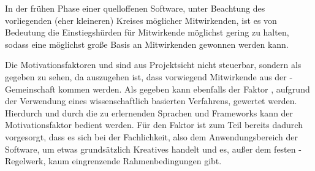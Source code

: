 In der frühen Phase einer quelloffenen Software, unter Beachtung des vorliegenden (eher kleineren) Kreises möglicher Mitwirkenden, ist es von Bedeutung die Einstiegshürden für Mitwirkende möglichst gering zu halten, sodass eine möglichst große Basis an Mitwirkenden gewonnen werden kann.

Die Motivationsfaktoren  und  sind aus Projektsicht nicht steuerbar, sondern als gegeben zu sehen, da auszugehen ist, dass vorwiegend Mitwirkende aus der -Gemeinschaft kommen werden.
Als gegeben kann ebenfalls der Faktor , aufgrund der Verwendung eines wissenschaftlich basierten Verfahrens, gewertet werden.
Hierdurch und durch die zu erlernenden Sprachen und Frameworks kann der Motivationsfaktor  bedient werden.
Für den Faktor  ist zum Teil bereits dadurch vorgesorgt, dass es sich bei der Fachlichkeit, also dem Anwendungsbereich der Software, um etwas grundsätzlich Kreatives handelt und es, außer dem festen -Regelwerk, kaum eingrenzende Rahmenbedingungen gibt.

